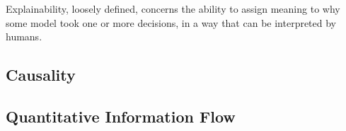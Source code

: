 




Explainability, loosely defined, concerns the ability to assign meaning to why some model took one or more decisions, in a way that can be interpreted by humans. 

\subsection{Causality}



\subsection{Quantitative Information Flow}




